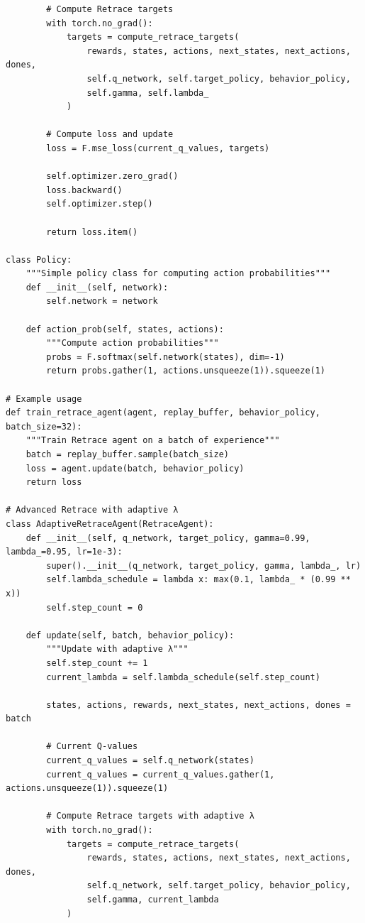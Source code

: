 \documentclass[12pt]{article}
\begin{document}
{{\begin{verbatim}
        # Compute Retrace targets
        with torch.no_grad():
            targets = compute_retrace_targets(
                rewards, states, actions, next_states, next_actions, dones,
                self.q_network, self.target_policy, behavior_policy,
                self.gamma, self.lambda_
            )
        
        # Compute loss and update
        loss = F.mse_loss(current_q_values, targets)
        
        self.optimizer.zero_grad()
        loss.backward()
        self.optimizer.step()
        
        return loss.item()

class Policy:
    """Simple policy class for computing action probabilities"""
    def __init__(self, network):
        self.network = network
    
    def action_prob(self, states, actions):
        """Compute action probabilities"""
        probs = F.softmax(self.network(states), dim=-1)
        return probs.gather(1, actions.unsqueeze(1)).squeeze(1)

# Example usage
def train_retrace_agent(agent, replay_buffer, behavior_policy, batch_size=32):
    """Train Retrace agent on a batch of experience"""
    batch = replay_buffer.sample(batch_size)
    loss = agent.update(batch, behavior_policy)
    return loss

# Advanced Retrace with adaptive λ
class AdaptiveRetraceAgent(RetraceAgent):
    def __init__(self, q_network, target_policy, gamma=0.99, lambda_=0.95, lr=1e-3):
        super().__init__(q_network, target_policy, gamma, lambda_, lr)
        self.lambda_schedule = lambda x: max(0.1, lambda_ * (0.99 ** x))
        self.step_count = 0
    
    def update(self, batch, behavior_policy):
        """Update with adaptive λ"""
        self.step_count += 1
        current_lambda = self.lambda_schedule(self.step_count)
        
        states, actions, rewards, next_states, next_actions, dones = batch
        
        # Current Q-values
        current_q_values = self.q_network(states)
        current_q_values = current_q_values.gather(1, actions.unsqueeze(1)).squeeze(1)
        
        # Compute Retrace targets with adaptive λ
        with torch.no_grad():
            targets = compute_retrace_targets(
                rewards, states, actions, next_states, next_actions, dones,
                self.q_network, self.target_policy, behavior_policy,
                self.gamma, current_lambda
            )
        

\end{verbatim}}}
\end{document}
